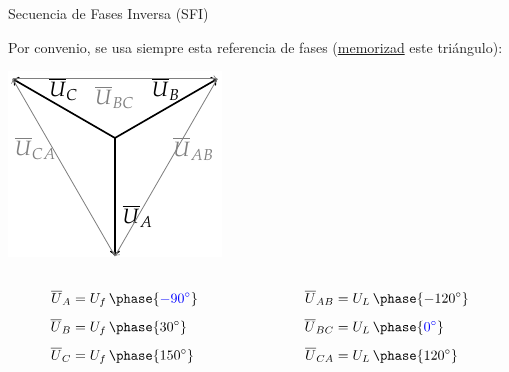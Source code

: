 \documentclass[aspectratio=169, usenames,svgnames,dvipsnames]{beamer}
\begin{document}
\begin{frame}{Secuencia de Fases Inversa (SFI)}

    \vspace{3mm}
    Por \alert{convenio}, se usa siempre esta \alert{referencia} de fases (\underline{memorizad} este triángulo):

    \vspace{3mm}
    \begin{center}
        \includegraphics[height=0.49\textheight]{../figs/FasoresTrifasica_ACB.pdf}
    \end{center}

    \vspace{-6mm}
    \begin{columns}
    \begin{column}{0.5\columnwidth}
        \begin{align*}
          \overline{U}_A &= U_f \, \phase{{\color{blue}\ang{-90}}}\\[4pt]
          \overline{U}_B &= U_f \, \phase{\ang{30}}\\[4pt]
          \overline{U}_C &= U_f \, \phase{\ang{150}}
        \end{align*}
    \end{column}   
    \begin{column}{0.5\columnwidth}
        \begin{align*}
          \overline{U}_{AB} &= U_L \, \phase{\ang{-120}}\\[4pt]
          \overline{U}_{BC} &= U_L \, \phase{{\color{blue}\ang{0}}}\\[4pt]
          \overline{U}_{CA} &= U_L \, \phase{\ang{120}}
        \end{align*}
    \end{column}
    \end{columns}


\end{frame}
\end{document}

